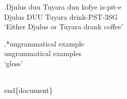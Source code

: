 \documentclass{article}
\begin{document}
\exg.Djulus duu Tuyara duu kofye is-pit-e\\
Djulus DUU Tuyara drink-PST-3SG\\
`Either Djulus or Tuyara drank coffee'

\exg.*ungrammatical example\\
ungrammatical examples\\
`gloss'

\\end\{document\}
\end{document}

